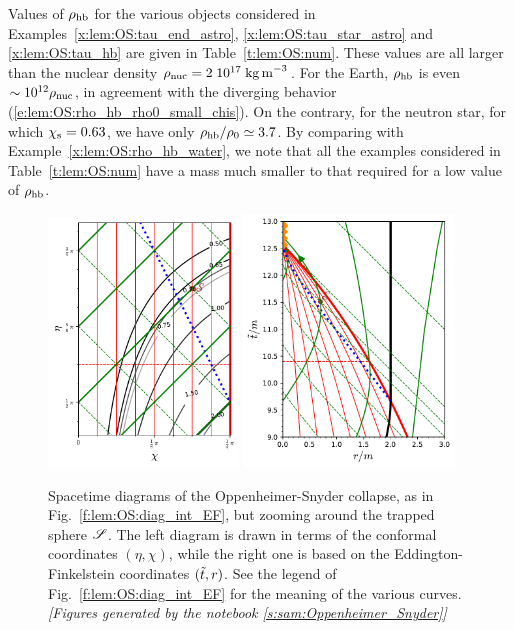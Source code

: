 \begin{example}
Values of $\rho_{\rm hb}$ for the various objects considered in
Examples~\ref{x:lem:OS:tau_end_astro}, \ref{x:lem:OS:tau_star_astro}
and \ref{x:lem:OS:tau_hb}
are given in Table~\ref{t:lem:OS:num}. These values are all
larger than the nuclear density $\rho_{\rm nuc} = 2\; 10^{17} \; {\rm kg\, m}^{-3}$.
For the Earth, $\rho_{\rm hb}$ is even $\sim 10^{12} \rho_{\rm nuc}$,
in agreement with the diverging behavior (\ref{e:lem:OS:rho_hb_rho0_small_chis}).
On the contrary, for the neutron star, for which $\chi_{\rm s} = 0.63$,
we have only $\rho_{\rm hb} / \rho_0 \simeq 3.7$. By comparing with
Example~\ref{x:lem:OS:rho_hb_water},
we note that all the examples
considered in Table~\ref{t:lem:OS:num} have a mass much smaller to that
required for a low value of $\rho_{\rm hb}$.
\end{example}

\begin{figure}
\centerline{
\includegraphics[width=0.45\textwidth]{lem_OS_diag_int_zoom.pdf}\qquad
\includegraphics[width=0.5\textwidth]{lem_OS_diag_EF_zoom.pdf}
}
\caption[]{\label{f:lem:OS:diag_trapped} \footnotesize
Spacetime diagrams of the Oppenheimer-Snyder collapse, as in Fig.~\ref{f:lem:OS:diag_int_EF},
but zooming around the trapped sphere $\mathscr{S}$.
The left diagram is drawn in terms of the
conformal coordinates $(\eta,\chi)$, while the right one is based on
the Eddington-Finkelstein coordinates $({\tilde t}, r)$.
See the legend of Fig.~\ref{f:lem:OS:diag_int_EF} for the meaning of the
various curves.
\textsl{[Figures generated by the notebook \ref{s:sam:Oppenheimer_Snyder}]}
}
\end{figure}




